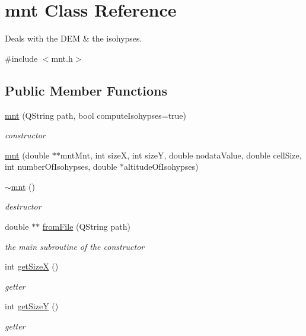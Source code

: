 \hypertarget{classmnt}{\section{mnt Class Reference}
\label{classmnt}
}


Deals with the D\+E\+M \& the isohypses.  




{\ttfamily \#include $<$mnt.\+h$>$}

\subsection*{Public Member Functions}
\begin{DoxyCompactItemize}
\item 
\hyperlink{classmnt_a6364f0c2b3c9e22892412d801c190a3b}{mnt} (Q\+String path, bool compute\+Isohypses=true)
\begin{DoxyCompactList}\small\item\em constructor \end{DoxyCompactList}\item 
\hyperlink{classmnt_a8c529a4579c4acfbd7a0a39209b50351}{mnt} (double $\ast$$\ast$mnt\+Mnt, int size\+X, int size\+Y, double nodata\+Value, double cell\+Size, int number\+Of\+Isohypses, double $\ast$altitude\+Of\+Isohypses)
\item 
\hyperlink{classmnt_a14e56996e6241d28e7aaad061496e8fe}{$\sim$mnt} ()
\begin{DoxyCompactList}\small\item\em destructor \end{DoxyCompactList}\item 
double $\ast$$\ast$ \hyperlink{classmnt_a6e7ba851b2e61445405e157873a86e7c}{from\+File} (Q\+String path)
\begin{DoxyCompactList}\small\item\em the main subroutine of the constructor \end{DoxyCompactList}\item 
int \hyperlink{classmnt_a13e8f8a15dabb1325fd82329af205b55}{get\+Size\+X} ()
\begin{DoxyCompactList}\small\item\em getter \end{DoxyCompactList}\item 
int \hyperlink{classmnt_a3c02bb363dc1f50d10c25d1a16c381bb}{get\+Size\+Y} ()
\begin{DoxyCompactList}\small\item\em getter \end{DoxyCompactList}\item 

\end{DoxyCompactItemize}
